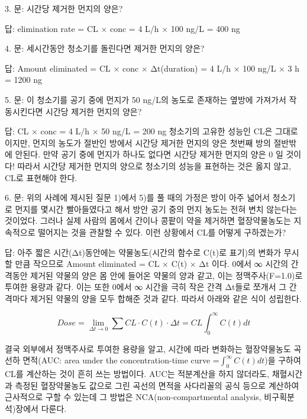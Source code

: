 \documentclass[
  11pt,
  krantz2, a4paper, twoside]{krantz}
\makeatletter
\newenvironment{kframe}{%
\medskip{}
\setlength{\fboxsep}{.8em}
 \def\at@end@of@kframe{}%
 \ifinner\ifhmode%
  \def\at@end@of@kframe{\end{minipage}}%
  \begin{minipage}{\columnwidth}%
 \fi\fi%
 \def\FrameCommand##1{\hskip\@totalleftmargin \hskip-\fboxsep
 \colorbox{shadecolor}{##1}\hskip-\fboxsep
     \hskip-\linewidth \hskip-\@totalleftmargin \hskip\columnwidth}%
 \MakeFramed {\advance\hsize-\width
   \@totalleftmargin\z@ \linewidth\hsize
   \@setminipage}}%
 {\par\unskip\endMakeFramed%
 \at@end@of@kframe}
\newenvironment{rmdblock}[1]
  {
  \begin{itemize}
  \renewcommand{\labelitemi}{
    \raisebox{-.7\height}[0pt][0pt]{
      {\setkeys{Gin}{width=3em,keepaspectratio}\texttt{[image: images/\#1]}}
    }
  }
  \setlength{\fboxsep}{1em}
  \begin{kframe}
  \item
  }
  {
  \end{kframe}
  \end{itemize}
  }
\newenvironment{rmdtip}
  {\begin{rmdblock}{tip}}
  {\end{rmdblock}}
\theoremstyle{definition}
\theoremstyle{definition}
\theoremstyle{definition}
\theoremstyle{definition}
\theoremstyle{remark}
\makeatother
\begin{document}
\begin{rmdtip}
3. 문: 시간당 제거한 먼지의 양은?

답: elimination rate = CL × conc = 4 L/h × 100 ng/L = 400 ng
\end{rmdtip}

\begin{rmdtip}
4. 문: 세시간동안 청소기를 돌린다면 제거한 먼지의 양은?

답: Amount eliminated = CL × conc × Δt(duration) = 4 L/h × 100 ng/L × 3 h = 1200 ng
\end{rmdtip}

\begin{rmdtip}
5. 문: 이 청소기를 공기 중에 먼지가 50 ng/L의 농도로 존재하는 옆방에 가져가서 작동시킨다면 시간당 제거한 먼지의 양은?

답: CL × conc = 4 L/h × 50 ng/L = 200 ng 청소기의 고유한 성능인 CL은
그대로이지만, 먼지의 농도가 절반인 방에서 시간당 제거한 먼지의 양은
첫번째 방의 절반밖에 안된다. 만약 공기 중에 먼지가 하나도 없다면
시간당 제거한 먼지의 양은 0 일 것이다! 따라서 시간당 제거한 먼지의
양으로 청소기의 성능을 표현하는 것은 옳지 않고, CL로 표현해야 한다.
\end{rmdtip}

\begin{rmdtip}
6. 문: 위의 사례에 제시된 질문 1)에서 5)를 풀 때의 가정은 방이 아주 넓어서 청소기로 먼지를 몇시간 빨아들였다고 해서 방안 공기 중의 먼지 농도는 전혀 변치 않는다는 것이었다. 그러나 실제 사람의 몸에서 간이나 콩팥이 약을 제거하면 혈장약물농도는 지속적으로 떨어지는 것을 관찰할 수 있다. 이런 상황에서 CL를 어떻게 구하겠는가?

답: 아주 짧은 시간(Δt)동안에는 약물농도(시간의 함수로 C(t)로 표기)의
변화가 무시할 만큼 작으므로 Amount eliminated = CL × C(t) × Δt 이다.
0에서 ∞ 시간의 간격동안 제거된 약물의 양은 몸 안에 들어온 약물의 양과
같고, 이는 정맥주사(F=1.0)로 투여한 용량과 같다. 이는 또한 0에서 ∞
시간을 극히 작은 간격 Δt들로 쪼개서 그 간격마다 제거된 약물의 양을
모두 합해준 것과 같다. 따라서 아래와 같은 식이 성립한다.

\[
Dose = \lim_{\Delta t \rightarrow 0}{\sum_{}^{}{CL \cdot C\left( t \right) \cdot \Delta t = CL\int_{0}^{\infty}{C\left( t \right)dt}}}
\]

결국 외부에서 정맥주사로 투여한 용량을 알고, 시간에 따라 변화하는 혈장약물농도 곡선하 면적(AUC: area under the concentration-time curve =\(\int_{0}^{\infty}{C\left( t \right){dt}}\))을 구하여 CL를 계산하는 것이 흔히 쓰는 방법이다.
AUC는 적분계산을 하지 않더라도, 채혈시간과 측정된 혈장약물농도 값으로 그린 곡선의 면적을 사다리꼴의 공식 등으로 계산하여 근사적으로 구할 수 있는데 그 방법은 NCA(non-compartmental analysis, 비구획분석)장에서 다룬다.
\end{rmdtip}
\end{document}
